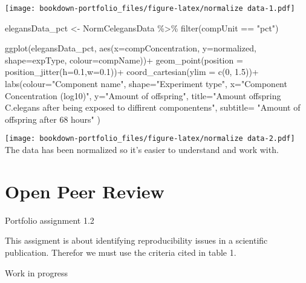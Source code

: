 \documentclass[
]{book}
\newenvironment{Shaded}{\begin{snugshade}}{\end{snugshade}}
\newcommand{\AttributeTok}[1]{\textcolor[rgb]{0.77,0.63,0.00}{#1}}
\newcommand{\DecValTok}[1]{\textcolor[rgb]{0.00,0.00,0.81}{#1}}
\newcommand{\FloatTok}[1]{\textcolor[rgb]{0.00,0.00,0.81}{#1}}
\newcommand{\FunctionTok}[1]{\textcolor[rgb]{0.00,0.00,0.00}{#1}}
\newcommand{\NormalTok}[1]{#1}
\newcommand{\OtherTok}[1]{\textcolor[rgb]{0.56,0.35,0.01}{#1}}
\newcommand{\SpecialCharTok}[1]{\textcolor[rgb]{0.00,0.00,0.00}{#1}}
\newcommand{\StringTok}[1]{\textcolor[rgb]{0.31,0.60,0.02}{#1}}
\begin{document}
\texttt{[image: bookdown-portfolio\_files/figure-latex/normalize data-1.pdf]}

\begin{Shaded}
\begin{Highlighting}[]
\NormalTok{elegansData\_pct }\OtherTok{\textless{}{-}}\NormalTok{ NormCelegansData }\SpecialCharTok{\%\textgreater{}\%} \FunctionTok{filter}\NormalTok{(compUnit }\SpecialCharTok{==} \StringTok{"pct"}\NormalTok{)}

\FunctionTok{ggplot}\NormalTok{(elegansData\_pct, }\FunctionTok{aes}\NormalTok{(}\AttributeTok{x=}\NormalTok{compConcentration, }\AttributeTok{y=}\NormalTok{normalized, }\AttributeTok{shape=}\NormalTok{expType, }\AttributeTok{colour=}\NormalTok{compName))}\SpecialCharTok{+}
  \FunctionTok{geom\_point}\NormalTok{(}\AttributeTok{position =} \FunctionTok{position\_jitter}\NormalTok{(}\AttributeTok{h=}\FloatTok{0.1}\NormalTok{,}\AttributeTok{w=}\FloatTok{0.1}\NormalTok{))}\SpecialCharTok{+}
  \FunctionTok{coord\_cartesian}\NormalTok{(}\AttributeTok{ylim =} \FunctionTok{c}\NormalTok{(}\DecValTok{0}\NormalTok{, }\FloatTok{1.5}\NormalTok{))}\SpecialCharTok{+}
  \FunctionTok{labs}\NormalTok{(}\AttributeTok{colour=}\StringTok{"Component name"}\NormalTok{, }\AttributeTok{shape=}\StringTok{"Experiment type"}\NormalTok{,}
       \AttributeTok{x=}\StringTok{"Component Concentration (log10)"}\NormalTok{,}
       \AttributeTok{y=}\StringTok{"Amount of offspring"}\NormalTok{,}
       \AttributeTok{title=}\StringTok{"Amount offspring C.elegans after being exposed to diffirent componentens"}\NormalTok{,}
       \AttributeTok{subtitle=} \StringTok{"Amount of offspring after 68 hours"}
\NormalTok{)}
\end{Highlighting}
\end{Shaded}

\texttt{[image: bookdown-portfolio\_files/figure-latex/normalize data-2.pdf]}
The data has been normalized so it's easier to understand and work with.

\hypertarget{open-peer-review}{%
\chapter{Open Peer Review}\label{open-peer-review}}

Portfolio assignment 1.2

This assigment is about identifying reproducibility issues in a scientific publication. Therefor we must use the criteria cited in table 1.

Work in progress
\end{document}
